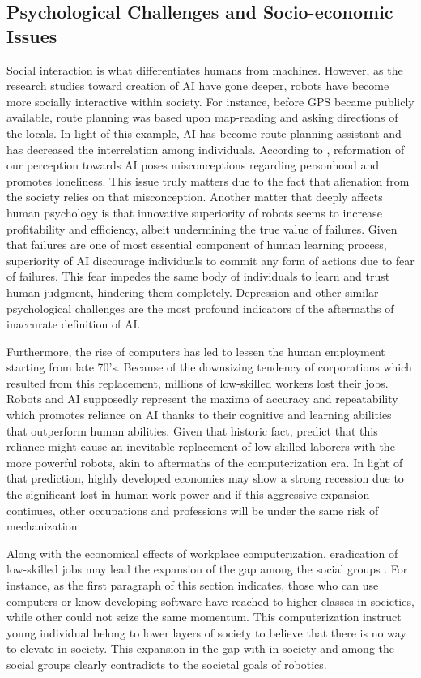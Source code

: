 \documentclass[man]{apa6}
\begin{document}
\subsection{Psychological Challenges and Socio-economic Issues}
Social interaction is what differentiates humans from machines.
However, as the research studies toward creation of AI have gone deeper, robots have become more socially interactive within society.
For instance, before GPS became publicly available, route planning was based upon map-reading and asking directions of the locals.
In light of this example, AI has become route planning assistant and has decreased the interrelation among individuals.
According to , reformation of our perception towards AI poses misconceptions regarding personhood and promotes loneliness. This issue truly matters due to the fact that alienation from the society relies on that misconception.
Another matter that deeply affects human psychology is that innovative superiority of robots seems to increase profitability and efficiency, albeit undermining the true value of failures.
Given that failures are one of most essential component of human learning process, superiority of AI discourage individuals to commit any form of actions due to fear of failures. 
This fear impedes the same body of individuals to learn and trust human judgment, hindering them completely.
Depression and other similar psychological challenges are the most profound indicators of the aftermaths of inaccurate definition of AI. \par

Furthermore, the rise of computers has led to lessen the human employment starting from late 70's.
Because of the downsizing tendency of corporations which resulted from this replacement, millions of low-skilled workers lost their jobs.
Robots and AI supposedly represent the maxima of accuracy and repeatability which promotes reliance on AI thanks to their cognitive and learning abilities that outperform human abilities.
Given that historic fact,  predict that this reliance might cause an inevitable replacement of low-skilled laborers with the more powerful robots, akin to aftermaths of the computerization era.
In light of that prediction, highly developed economies may show a strong recession due to the significant lost in human work power and if this aggressive expansion continues, other occupations and professions will be under the same risk of mechanization. \par

Along with the economical effects of workplace computerization, eradication of low-skilled jobs may lead the expansion of the gap among the social groups \cite{gre}.
For instance, as the first paragraph of this section indicates, those who can use computers or know developing software have reached to higher classes in societies, while other could not seize the same momentum.
This computerization instruct young individual belong to lower layers of society to believe that there is no way to elevate in society.
This expansion in the gap with in society and among the social groups clearly contradicts to the societal goals of robotics.
\end{document}
